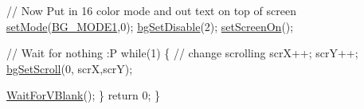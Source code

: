 \begin{DoxyCodeInclude}
    \textcolor{comment}{// Now Put in 16 color mode and out text on top of screen}
    \hyperlink{a00353_afd9e46ae627d055dd8c98a4b0ebb73b1}{setMode}(\hyperlink{a00317_a05c862edb7f8f75036f10c04dcc3c2a6}{BG\_MODE1},0);  \hyperlink{a00317_a4dbfb1b8854ff9ca4a7d11a899281bbb}{bgSetDisable}(2);
    \hyperlink{a00353_abc7d4ef8ebc22f5b710927909bb3f144}{setScreenOn}();

    \textcolor{comment}{// Wait for nothing :P}
    \textcolor{keywordflow}{while}(1) \{
        \textcolor{comment}{// change scrolling }
        scrX++; scrY++; 
        \hyperlink{a00317_aa5e0112ea2d4b514c2dddc6ed2c7c3c7}{bgSetScroll}(0, scrX,scrY);

        \hyperlink{a00326_a815e2626bd26d0e936d507a363ecd723}{WaitForVBlank}(); 
    \}
    \textcolor{keywordflow}{return} 0;
\}
\end{DoxyCodeInclude}
 